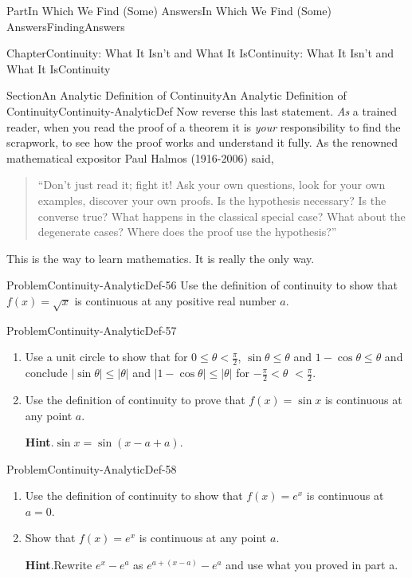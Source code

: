 \documentclass[oneside,10pt,]{book}
\newcommand{\blocktitlefont}{\relax}
\numberwithin{equation}{part}
\newcommand{\abs}[1]{\left|#1\right|}
\newcommand{\lt}{<}
\begin{document}
\begin{partptx}{Part}{In Which We Find (Some) Answers}{}{In Which We Find (Some) Answers}{}{}{FindingAnswers}
\begin{chapterptx}{Chapter}{Continuity: What It Isn't and What It Is}{}{Continuity: What It Isn't and What It Is}{}{}{Continuity}
\begin{sectionptx}{Section}{An Analytic Definition of Continuity}{}{An Analytic Definition of Continuity}{}{}{Continuity-AnalyticDef}
%
Now reverse this last statement.  \emph{As} a trained reader, when you read the proof of a theorem it is \emph{your} responsibility to find the scrapwork, to see how the proof works and understand it fully.  As the renowned mathematical expositor Paul Halmos  (1916-2006) said,%
\begin{quote}%
``Don't just read it; fight it! Ask your own questions, look for your own examples, discover your own proofs. Is the hypothesis necessary? Is the converse true? What happens in the classical special case? What about the degenerate cases? Where does the proof use the hypothesis?''%
\end{quote}
This is the way to learn mathematics.  It is really the only way.%
\begin{problem}{Problem}{}{Continuity-AnalyticDef-56}%
Use the definition of continuity to show that \(f(x)=\sqrt{x}\) is continuous at any positive real number \(a\).%
\end{problem}
\begin{problem}{Problem}{}{Continuity-AnalyticDef-57}%
\begin{enumerate}[font=\bfseries,label=(\alph*),ref=\alph*]%
\item{}Use a unit circle to show that for \(0\leq\theta\lt
\frac{\pi}{2}\), \(\sin \theta\leq\theta\) and \(1-\cos \theta\leq\theta\) and conclude \(\abs{\sin
\theta}\leq\abs{\theta}\) and \(\abs{1-\cos
\theta}\leq\abs{\theta}\) for \(-\frac{\pi}{2}\lt
\theta\) \(\lt \frac{\pi}{2}\).%
\item{}Use the definition of continuity to prove that \(f(x)=\sin x\) is continuous at any point \(a\).%
\par\smallskip%
\noindent\textbf{\blocktitlefont Hint}.\hypertarget{Continuity-AnalyticDef-57-3-2}{}\quad{}\(\sin x=\sin\left(x-a+a\right)\).%
\end{enumerate}%
\end{problem}
\begin{problem}{Problem}{}{Continuity-AnalyticDef-58}%
\begin{enumerate}[font=\bfseries,label=(\alph*),ref=\alph*]%
\item{}Use the definition of continuity to show that \(f(x)=e^x\) is continuous at \(a=0\).%
\item{}Show that \(f(x)=e^x\) is continuous at any point \(a\).%
\par\smallskip%
\noindent\textbf{\blocktitlefont Hint}.\hypertarget{Continuity-AnalyticDef-58-4-2}{}\quad{}Rewrite \(e^x-e^a\) as \(e^{a+(x-a)}-e^a\) and use what you proved in part a.%

\end{enumerate}
\end{problem}
\end{sectionptx}
\end{chapterptx}
\end{partptx}
\end{document}

